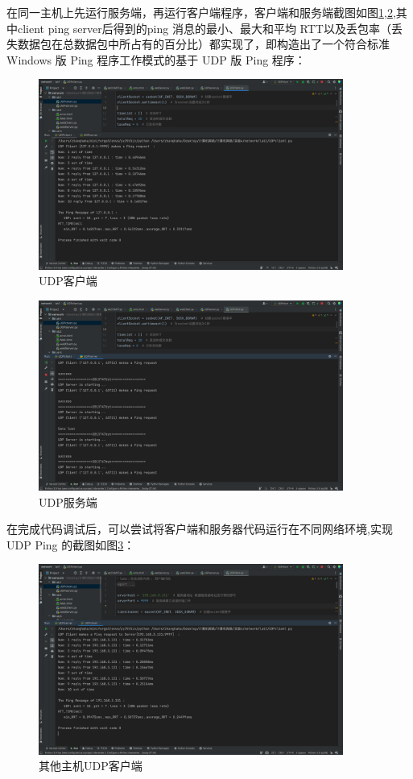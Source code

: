 \documentclass[a4paper,12pt]{report}
\begin{document}
\begin{spacing}{1.5}
在同一主机上先运行服务端，再运行客户端程序，客户端和服务端截图如图\ref{3},\ref{4},其中client ping server后得到的ping 消息的最小、最大和平均 RTT以及丢包率（丢失数据包在总数据包中所占有的百分比）都实现了，即构造出了一个符合标准 Windows 版 Ping 程序工作模式的基于 UDP 版 Ping 程序：
\begin{figure}[H]
  \centering
\includegraphics[width=10cm]{figure/udp_c_w.png}
\caption{UDP客户端}
\label{3}
\end{figure}
\begin{figure}[H]
  \centering
\includegraphics[width=10cm]{figure/udp_s_w.png}
\caption{UDP服务端}
\label{4}
\end{figure}

在完成代码调试后，可以尝试将客户端和服务器代码运行在不同网络环境,实现UDP Ping 的截图如图\ref{5}：
\begin{figure}[H]
  \centering
\includegraphics[width=10cm]{figure/pc_udp_c.png}
\caption{其他主机UDP客户端}
\label{5}
\end{figure}




\end{spacing}
\end{document}

